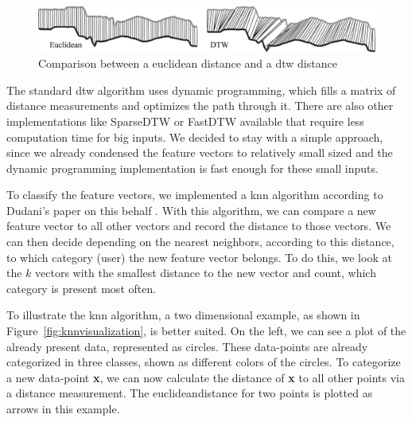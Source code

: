 \begin{figure}
    \centering
    \includegraphics[width=\textwidth]{figures/EuclideanvsDTW.png}
    \caption{Comparison between a euclidean distance and a \gls{dtw} distance \cite{keogh2005exact}}
    \label{fig:euclideandtw}
\end{figure}

The standard \gls{dtw} algorithm uses dynamic programming, which fills a matrix of distance measurements and optimizes the path through it. There are also other implementations like SparseDTW or FastDTW available that require less computation time for big inputs. We decided to stay with a simple approach, since we already condensed the feature vectors to relatively small sized and the dynamic programming implementation is fast enough for these small inputs.

To classify the feature vectors, we implemented a \gls{knn} algorithm according to Dudani's paper on this behalf \cite{dudani1976distance}. With this algorithm, we can compare a new feature vector to all other vectors and record the distance to those vectors. We can then decide depending on the nearest neighbors, according to this distance, to which category (\ie user) the new feature vector belongs. To do this, we look at the $k$ vectors with the smallest distance to the new vector and count, which category is present most often.

To illustrate the \gls{knn} algorithm, a two dimensional example, as shown in Figure~\ref{fig:knnvisualization}, is better suited. On the left, we can see a plot of the already present data, represented as circles. These data-points are already categorized in three classes, shown as different colors of the circles. To categorize a new data-point \textbf{x}, we can now calculate the distance of \textbf{x} to all other points via a distance measurement. The \gls{euclideandistance} for two points is plotted as arrows in this example.

